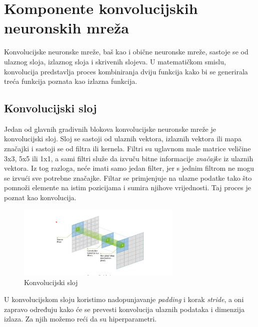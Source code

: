 
\chapter{Komponente konvolucijskih neuronskih mreža}\label{ch:komponente-konvolucijskih-neuronskih-mreza}
Konvolucijske neuronske mreže, baš kao i obične neuronske mreže, sastoje se od ulaznog sloja, izlaznog sloja i skrivenih slojeva.
U matematičkom smislu, konvolucija predstavlja proces kombiniranja dviju funkcija kako bi se generirala treća funkcija poznata kao izlazna funkcija.

\section{Konvolucijski sloj}\label{sec:konvolucijski-sloj}
Jedan od glavnih gradivnih blokova konvolucijske neuronske mreže je konvolucijski sloj.
Sloj se sastoji od ulaznih vektora, izlaznih vektora ili mapa značajki i sastoji se od filtra ili kernela.
Filtri su uglavnom male matrice veličine 3x3, 5x5 ili 1x1, a sami filtri služe da izvuču bitne informacije \emph{značajke} iz ulaznih vektora.
Iz tog razloga, neće imati samo jedan filter, jer s jednim filtrom ne mogu se izvući sve potrebne značajke.
Filtar se primjenjuje na ulazne podatke tako što pomnoži elemente na istim pozicijama i sumira njihove vrijednosti.
Taj proces je poznat kao konvolucija.

\FloatBarrier
\begin{figure}[h]
    \centering
    \includegraphics[width=0.7\textwidth]{images/Convolution}
    \caption{Konvolucijski sloj
    \protect\footnotemark}
    \label{fig:slika13}
\end{figure}
\FloatBarrier


U konvolucijskom sloju koristimo nadopunjavanje \emph{padding} i korak \emph{stride}, a oni zapravo određuju kako će se prevesti konvolucija ulaznih podataka i dimenzija izlaza.
Za njih možemo reći da su hiperparametri.

